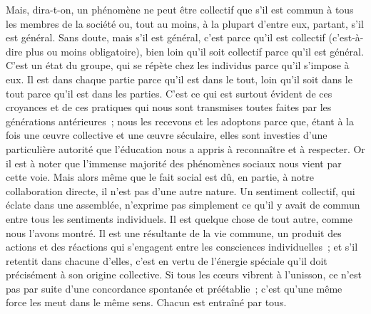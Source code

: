 \documentclass[french,twoside]{book} %
\begin{document}
Mais, dira-t-on, un phénomène ne peut être collectif que s’il est commun à tous les membres de la société ou, tout au moins, à la plupart d’entre eux, partant, s’il est général. Sans doute, mais s’il est général, c’est parce qu’il est collectif (c’est-à-dire plus ou moins obligatoire), bien loin qu’il soit collectif parce qu’il est général. C’est un état du groupe, qui se répète chez les individus parce qu’il s’impose à eux. Il est dans chaque partie parce qu’il est dans le tout, loin qu’il soit dans le tout parce qu’il est dans les parties. C’est ce qui est surtout évident de ces croyances et de ces pratiques qui nous sont transmises toutes faites par les générations antérieures ; nous les recevons et les adoptons parce que, étant à la fois une œuvre collective et une œuvre séculaire, elles sont investies d’une particulière autorité que l’éducation nous a appris à reconnaître et à respecter. Or il est à noter que l’immense majorité des phénomènes sociaux nous vient par cette voie. Mais alors même que le fait social est dû, en partie, à notre collaboration directe, il n’est pas d’une autre nature. Un sentiment collectif, qui éclate dans une assemblée, n’exprime pas simplement ce qu’il y avait de commun entre tous les sentiments individuels. Il est quelque chose de tout autre, comme nous l’avons montré. Il est une résultante de la vie commune, un produit des actions et des réactions qui s’engagent entre les consciences individuelles ; et s’il retentit dans chacune d’elles, c’est en vertu de l’énergie spéciale qu’il doit précisément à son origine collective. Si tous les cœurs vibrent à l’unisson, ce n’est pas par suite d’une concordance spontanée et préétablie ; c’est qu’une même force les meut dans le même sens. Chacun est entraîné par tous.\par
\end{document}

